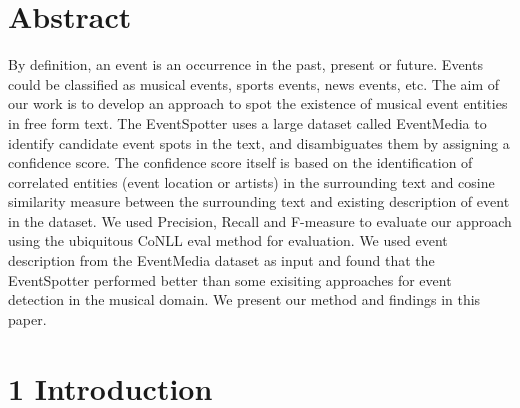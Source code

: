 \documentclass[a4paper,11pt]{report}
\begin{document}
\chapter*{Abstract}
By definition, an event is an occurrence in the past, present or future. Events could be classified as musical events, sports events, news events, etc. The aim of our work is to develop an approach to spot the existence of musical event entities in free form text. The EventSpotter uses a large dataset called EventMedia to identify candidate event spots in the text, and disambiguates them by assigning a confidence score. The confidence score itself is based on the identification of correlated entities (event location or artists) in the surrounding text and cosine similarity measure between the surrounding text and existing description of event in the dataset. We used Precision, Recall and F-measure to evaluate our approach using the ubiquitous CoNLL eval method for evaluation. We used event description from the EventMedia dataset as input and found that the EventSpotter performed better than some exisiting approaches for event detection in the musical domain. We present our method and findings in this paper.

\chapter*{1 Introduction}
\end{document}
